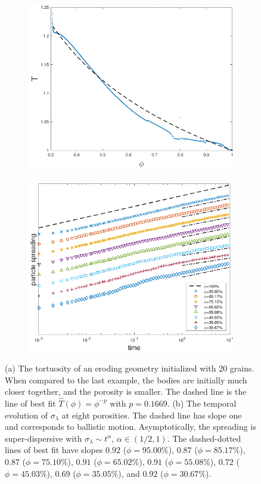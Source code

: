 \documentclass{jfm}
\begin{document}
\begin{figure}
\begin{subfigure}[b]{0.5\textwidth}
\includegraphics*[height = 0.8\linewidth]{./figs/tort_eulerian20b}
\caption{}
\end{subfigure}
\begin{subfigure}[b]{0.5\textwidth}
\includegraphics*[height=0.8\linewidth]{./figs/20b_dense_second_moment_ref}
\caption{}
\end{subfigure}
\caption{\label{fig:ErodingLow20Transport} (a) The tortuosity  of an
eroding geometry initialized with 20 grains.  When compared to the last
example, the bodies are initially much closer together, and the porosity
is smaller.  The dashed line is the line of best fit
$\widehat{T}(\phi)=\phi^{-p}$ with $p=0.1669$.  (b) The temporal
evolution of $\sigma_\lambda$ at eight porosities.  The dashed line has
slope one and corresponds to ballistic motion. Asymptotically, the
spreading is super-dispersive with $\sigma_\lambda \sim t^{\alpha}$,
$\alpha \in (1/2,1)$.  The dashed-dotted lines of best fit have slopes
$0.92$ ($\phi=95.00\%$), $0.87$ ($\phi=85.17\%$), $0.87$
($\phi=75.10\%$), $0.91$ ($\phi=65.02\%$), $0.91$ ($\phi=55.08\%$),
$0.72$ ($\phi=45.03\%$), $0.69$ ($\phi=35.05\%$), and $0.92$
($\phi=30.67\%$).}
\end{figure}
\end{document}
